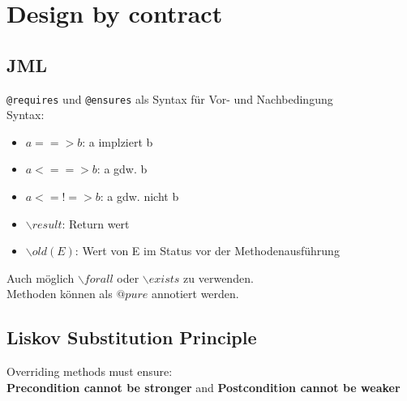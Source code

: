 \section{Design by contract}
\subsection{JML}

\texttt{@requires} und \texttt{@ensures} als Syntax für Vor- und Nachbedingung\\
Syntax:
\begin{itemize}
  \item $a ==> b$: a implziert b
  \item $a <==> b$: a gdw. b
  \item $a <=!=> b$: a gdw. nicht b
  \item $\backslash result$: Return wert
  \item $\backslash old(E)$: Wert von E im Status vor der Methodenausführung
\end{itemize}
Auch möglich $\backslash forall$ oder $\backslash exists$ zu verwenden.\\

Methoden können als $@pure$ annotiert werden.

\subsection{Liskov Substitution Principle}
Overriding methods must ensure:\\
\textbf{Precondition cannot be stronger} and \textbf{Postcondition cannot be weaker}\\

